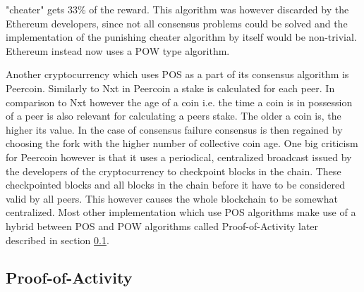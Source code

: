 "cheater" gets 33\% of the reward.\cite{url:eth_slash} This algorithm was however discarded by the Ethereum developers, since not all consensus problems could be solved and the implementation of the punishing cheater
algorithm by itself would be non-trivial.\cite{url:eth_no_slash} Ethereum instead now uses a POW type algorithm.\cite{url:eth_pow}\par
Another cryptocurrency which uses POS as a part of its consensus algorithm is Peercoin. Similarly to Nxt in Peercoin a stake is calculated for each peer. In comparison to Nxt however the age
of a coin i.e. the time a coin is in possession of a peer is also relevant for calculating a peers stake. The older a coin is, the higher its value. In the case of consensus failure consensus is then
regained by choosing the fork with the higher number of collective coin age.\cite{url:peercoin} One big criticism for Peercoin however is that it uses a periodical, 
centralized broadcast issued by the developers of the cryptocurrency to checkpoint blocks in the chain.
These checkpointed blocks and all blocks in the chain before it have to be considered valid by all peers. This however causes the whole blockchain to be somewhat centralized.
Most other implementation which use POS algorithms make use of a hybrid between POS and POW algorithms called Proof-of-Activity later described in section \ref{poa}.

\subsection{Proof-of-Activity} \label{poa}


